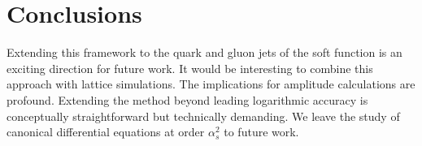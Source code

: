 \section{Conclusions}\label{sec:conclusions}

Extending this framework to the quark and gluon jets of the soft
function is an exciting direction for future work. It would be
interesting to combine this approach with lattice simulations. The
implications for amplitude calculations are profound. Extending the
method beyond leading logarithmic accuracy is conceptually
straightforward but technically demanding. We leave the study of
canonical differential equations at order $\alpha_s^2$ to future work.

